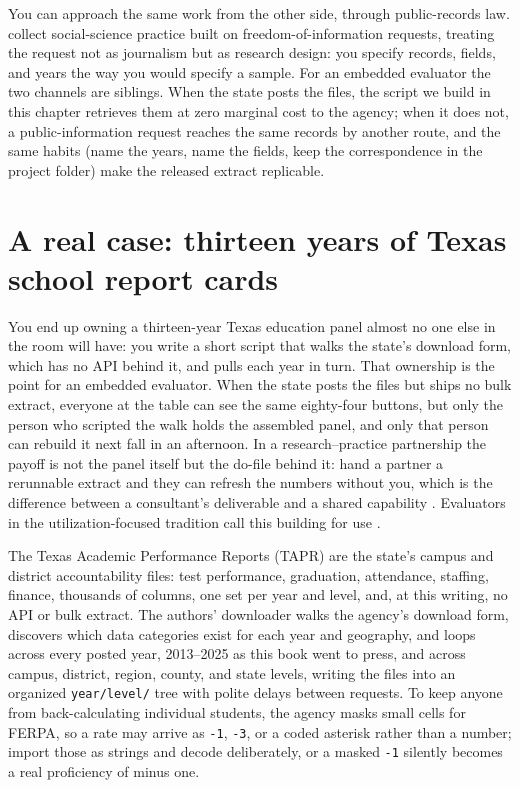 \documentclass[
    a4paper,
    fontsize=10pt,
    twoside=true,
    numbers=noenddot,
]{kaobook}
\begin{document}
You can approach the same work from the other side, through public-records law. \textcite{walby2019foi} collect social-science practice built on freedom-of-information requests, treating the request not as journalism but as research design: you specify records, fields, and years the way you would specify a sample. For an embedded evaluator the two channels are siblings. When the state posts the files, the script we build in this chapter retrieves them at zero marginal cost to the agency; when it does not, a public-information request reaches the same records by another route, and the same habits (name the years, name the fields, keep the correspondence in the project folder) make the released extract replicable.

\section{A real case: thirteen years of Texas school report cards}
You end up owning a thirteen-year Texas education panel almost no one else in the room will have: you write a short script that walks the state's download form, which has no API behind it, and pulls each year in turn. That ownership is the point for an embedded evaluator. When the state posts the files but ships no bulk extract, everyone at the table can see the same eighty-four buttons, but only the person who scripted the walk holds the assembled panel, and only that person can rebuild it next fall in an afternoon. In a research--practice partnership the payoff is not the panel itself but the do-file behind it: hand a partner a rerunnable extract and they can refresh the numbers without you, which is the difference between a consultant's deliverable and a shared capability \parencite{coburn2016partnerships}. Evaluators in the utilization-focused tradition call this building for use \parencite{patton2008utilization}.

The Texas Academic Performance Reports (TAPR) are the state's campus and district accountability files: test performance, graduation, attendance, staffing, finance, thousands of columns, one set per year and level, and, at this writing, no API or bulk extract. The authors' downloader walks the agency's download form, discovers which data categories exist for each year and geography, and loops across every posted year, 2013--2025 as this book went to press, and across campus, district, region, county, and state levels, writing the files into an organized \texttt{year/level/} tree with polite delays between requests. To keep anyone from back-calculating individual students, the agency masks small cells for FERPA, so a rate may arrive as \texttt{-1}, \texttt{-3}, or a coded asterisk rather than a number; import those as strings and decode deliberately, or a masked \texttt{-1} silently becomes a real proficiency of minus one.
\end{document}
